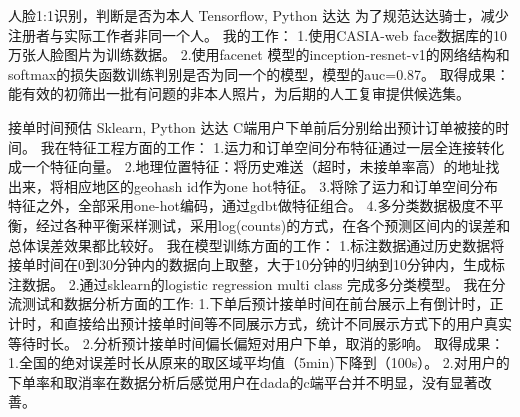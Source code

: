 \documentclass[11pt,a4paper]{moderncv}
\begin{document}
{人脸1:1识别，判断是否为本人}
{Tensorflow, Python}{}
{达达}
{
为了规范达达骑士，减少注册者与实际工作者非同一个人。
\newline
\newline 我的工作：
\newline 1.使用CASIA-web face数据库的10万张人脸图片为训练数据。
\newline 2.使用facenet 模型的inception-resnet-v1的网络结构和softmax的损失函数训练判别是否为同一个的模型，模型的auc=0.87。
\newline 取得成果：能有效的初筛出一批有问题的非本人照片，为后期的人工复审提供候选集。
\newline
}

{接单时间预估}
{Sklearn, Python}{}
{达达}
{
C端用户下单前后分别给出预计订单被接的时间。
\newline
\newline  我在特征工程方面的工作：
\newline 1.运力和订单空间分布特征通过一层全连接转化成一个特征向量。
\newline 2.地理位置特征：将历史难送（超时，未接单率高）的地址找出来，将相应地区的geohash id作为one hot特征。
\newline 3.将除了运力和订单空间分布特征之外，全部采用one-hot编码，通过gdbt做特征组合。
\newline 4.多分类数据极度不平衡，经过各种平衡采样测试，采用log(counts)的方式，在各个预测区间内的误差和总体误差效果都比较好。
\newline 
\newline  我在模型训练方面的工作：
\newline 1.标注数据通过历史数据将接单时间在0到30分钟内的数据向上取整，大于10分钟的归纳到10分钟内，生成标注数据。
\newline 2.通过sklearn的logistic regression multi class 完成多分类模型。
\newline
\newline  我在分流测试和数据分析方面的工作:
\newline 1.下单后预计接单时间在前台展示上有倒计时，正计时，和直接给出预计接单时间等不同展示方式，统计不同展示方式下的用户真实等待时长。
\newline 2.分析预计接单时间偏长偏短对用户下单，取消的影响。
\newline
\newline  取得成果：
\newline  1.全国的绝对误差时长从原来的取区域平均值（5min)下降到（100s）。
\newline  2.对用户的下单率和取消率在数据分析后感觉用户在dada的c端平台并不明显，没有显著改善。
\newline
}
\end{document}
